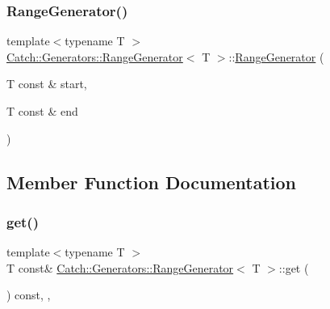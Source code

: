 \mbox{\label{class_catch_1_1_generators_1_1_range_generator_ac999eb143945ff311b97d2c767df90d3}} 
\subsubsection{\texorpdfstring{RangeGenerator()}{RangeGenerator()}\hspace{0.1cm}{\footnotesize\ttfamily [2/2]}}
{\footnotesize\ttfamily template$<$typename T $>$ \\
\mbox{\hyperlink{class_catch_1_1_generators_1_1_range_generator}{Catch\+::\+Generators\+::\+Range\+Generator}}$<$ T $>$\+::\mbox{\hyperlink{class_catch_1_1_generators_1_1_range_generator}{Range\+Generator}} (\begin{DoxyParamCaption}\item[{T const \&}]{start,  }\item[{T const \&}]{end }\end{DoxyParamCaption})\hspace{0.3cm}{\ttfamily [inline]}}



\subsection{Member Function Documentation}
\mbox{\label{class_catch_1_1_generators_1_1_range_generator_a2639173bb9f06ba353314cd226fcefec}} 
\subsubsection{\texorpdfstring{get()}{get()}}
{\footnotesize\ttfamily template$<$typename T $>$ \\
T const\& \mbox{\hyperlink{class_catch_1_1_generators_1_1_range_generator}{Catch\+::\+Generators\+::\+Range\+Generator}}$<$ T $>$\+::get (\begin{DoxyParamCaption}{ }\end{DoxyParamCaption}) const\hspace{0.3cm}{\ttfamily [inline]}, {\ttfamily [override]}, {\ttfamily [virtual]}}



